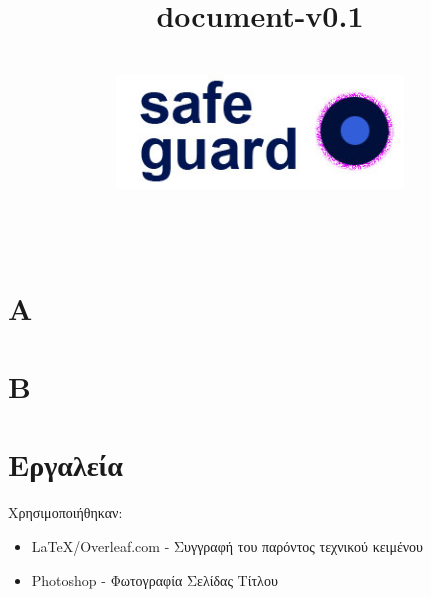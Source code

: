 \documentclass{article}
\title{document-v0.1}
\author{\\
\includegraphics[width=3in]{safeguard}\\[1ex]\\\\
}
\begin{document}
\maketitle


\newpage
\renewcommand{\contentsname}{Περιεχόμενα}
\tableofcontents


\section{A}

\section{B}

\section{Εργαλεία}
Χρησιμοποιήθηκαν:
\begin{itemize}
    \item \LaTeX/Overleaf.com - Συγγραφή του παρόντος τεχνικού κειμένου
    \item Photoshop - Φωτογραφία Σελίδας Τίτλου
    
\end{itemize}
\end{document}
